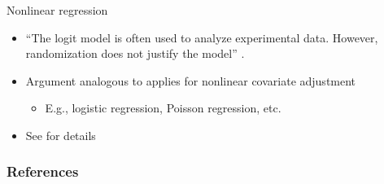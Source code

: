 \documentclass[table, xcolor = {dvipsnames}, 9pt]{beamer}
\theoremstyle{plain}
\begin{document}
\begin{frame}{Nonlinear regression} \vfill
\begin{itemize}
\item ``The logit model is often used to analyze experimental data. However, randomization does not justify the model'' \citep[][p.~237]{freedman2008b}. \vfill
\item Argument analogous to \citet{lin2013} applies for nonlinear covariate adjustment \vfill
\begin{itemize} \vfill
\item E.g., logistic regression, Poisson regression, etc. \vfill
\end{itemize} \vfill
\item See \citet{cohenfogarty2023} for details \vfill
\end{itemize}  \vfill
\end{frame}
\begin{frame}[allowframebreaks]
\frametitle{References} 
\scriptsize

\end{frame}
\end{document}

